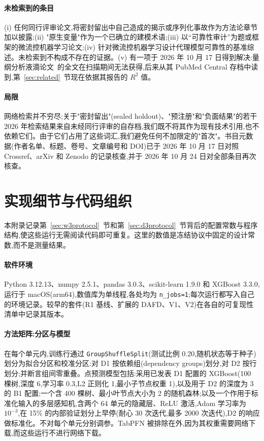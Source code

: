\documentclass[11pt,a4paper]{ctexart}
\begin{document}
\paragraph{未检索到的条目} (i) 任何同行评审论文,将密封留出中自己造成的揭示或序列化事故作为方法论章节加以披露;(ii) "原生变量"作为一个已确立的建模术语;(iii) 以“可靠性审计”为题或框架的微流控机器学习论文;(iv) 针对微流控机器学习设计代理模型可靠性的基准综述。未检索到不构成不存在的证据。(v) 有一项于 2026 年 10 月 17 日得到解决:量纲分析液滴论文~\cite{labchip2025dimless}的全文在扫描期间无法获得,后来从其 PubMed Central 存档中读到,第~\ref{sec:related}~节现在依据其报告的 $R^2$ 值。

\paragraph{局限} 网络检索并不穷尽;关于"密封留出"(sealed holdout)、"预注册"和"负面结果"的若干 2026 年检索结果来自未经同行评审的自存档,我们既不将其作为现有技术引用,也不依赖它们。由于它们占用了这些词汇,我们避免任何不加限定的"首次"。书目元数据(作者名单、标题、卷号、文章编号和 DOI)已于 2026 年 10 月 17 日对照 Crossref、arXiv 和 Zenodo 的记录核查,并于 2026 年 10 月 24 日对全部条目再次核查。

\section{实现细节与代码组织}
\label{app:impl}

本附录记录第~\ref{sec:w3protocol}~节和第~\ref{sec:d3protocol}~节背后的配置常数与程序结构,使这些运行无需阅读代码即可重复。这里的数值是冻结协议中固定的设计常数,而不是测量结果。

\paragraph{软件环境} Python 3.12.13、numpy 2.5.1、pandas 3.0.3、scikit-learn 1.9.0 和 XGBoost 3.3.0,运行于 macOS(arm64),数值库为单线程,各处均为 \texttt{n\_jobs=1};每次运行都写入自己的环境记录。较早的套件(R1 基线、扩展的 DAFD、V1、V2)在各自的可复现性清单中记录其版本。

\paragraph{方法矩阵:分区与模型} 在每个单元内,训练行通过 \texttt{GroupShuffleSplit}(测试比例 0.20,随机状态等于种子)划分为拟合分区和校准分区:对 D1 按依赖组(dependency groups)划分,对 D2 按行划分;并断言组间零重叠。点预测模型包括:采用已发表 D1 配置的 XGBoost(100 棵树,深度 6,学习率 0.3,L2 正则化 1,最小子节点权重 1),以及用于 D2 的深度为 3 的 B1 配置;一个含 400 棵树、最小叶节点大小为 2 的随机森林;以及一个作用于标准化输入的多层感知机,含两个 64 单元的隐藏层、ReLU 激活,Adam 学习率为 $10^{-3}$,在 15\% 的内部验证划分上早停(耐心 30 次迭代,最多 2000 次迭代),D2 的响应做标准化。不对每个单元分别调参。TabPFN 被排除在外,因为其权重需要网络下载,而这些运行不进行网络下载。
\end{document}
